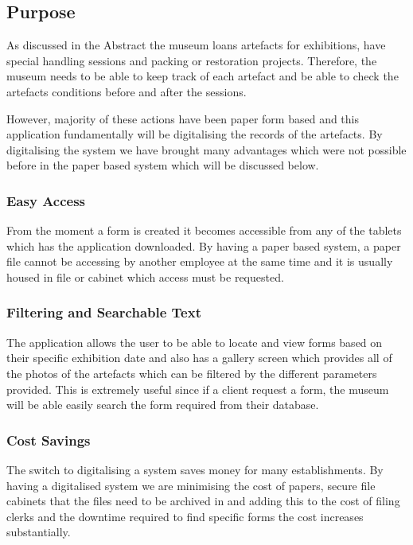 \documentclass[12pt]{article}
\begin{document}
\subsection{Purpose}\label{sec:purpose}
As discussed in the Abstract the museum loans artefacts for exhibitions, have special handling sessions and packing or restoration projects. Therefore, the museum needs to be able to keep track of each artefact and be able to check the artefacts conditions before and after the sessions. 
\par
However, majority of these actions have been paper form based and this application fundamentally will be digitalising the records of the artefacts. By digitalising the system we have brought many advantages which were not possible before in the paper based system which will be discussed below.  

\subsubsection{Easy Access}
From the moment a form is created it becomes accessible from any of the tablets which has the application downloaded. By having a paper based system, a paper file cannot be accessing by another employee at the same time and it is usually housed in file or cabinet which access must be requested.

\subsubsection{Filtering and Searchable Text}
The application allows the user to be able to locate and view forms based on their specific exhibition date and also has a gallery screen which provides all of the photos of the artefacts which can be filtered by the different parameters provided. This is extremely useful since if a client request a form, the museum will be able easily search the form required from their database.

\subsubsection{Cost Savings}
The switch to digitalising a system saves money for many establishments. By having a digitalised system we are minimising the cost of papers, secure file cabinets that the files need to be archived in and adding this to the cost of filing clerks and the downtime required to find specific forms the cost increases substantially.
\end{document}
